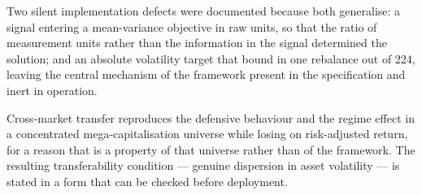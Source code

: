 Two silent implementation defects were documented because both generalise: a signal entering a
mean-variance objective in raw units, so that the ratio of measurement units rather than the
information in the signal determined the solution; and an absolute volatility target that bound in
one rebalance out of 224, leaving the central mechanism of the framework present in the
specification and inert in operation.

Cross-market transfer reproduces the defensive behaviour and the regime effect in a concentrated
mega-capitalisation universe while losing on risk-adjusted return, for a reason that is a property
of that universe rather than of the framework. The resulting transferability condition --- genuine
dispersion in asset volatility --- is stated in a form that can be checked before deployment.
